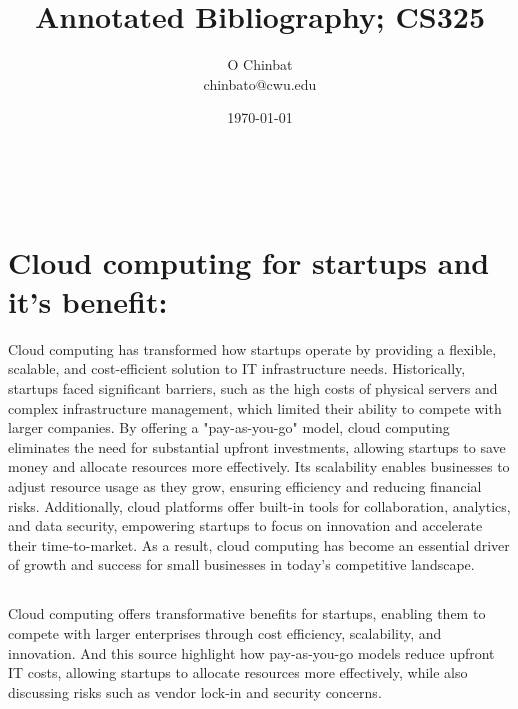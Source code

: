 \documentclass[12pt,letterpaper]{article}
\title{Annotated Bibliography; CS325}
\author{O Chinbat \\ chinbato@cwu.edu}
\date{\today}
\makeatletter
\renewcommand{\maketitle}{\bgroup
   \begin{center}
   \textbf{{\fontsize{18pt}{20}\selectfont \@title}}\\
   \vspace{10pt}
   {\fontsize{12pt}{0}\selectfont \@author} 
   \end{center}
}
\makeatother
\begin{document}
\maketitle
\thispagestyle{fancy}

\section*{Cloud computing for startups and it’s benefit: }
Cloud computing has transformed how startups operate by providing a flexible, scalable, and cost-efficient solution to IT infrastructure needs. Historically, startups faced significant barriers, such as the high costs of physical servers and complex infrastructure management, which limited their ability to compete with larger companies. By offering a "pay-as-you-go" model, cloud computing eliminates the need for substantial upfront investments, allowing startups to save money and allocate resources more effectively. Its scalability enables businesses to adjust resource usage as they grow, ensuring efficiency and reducing financial risks. Additionally, cloud platforms offer built-in tools for collaboration, analytics, and data security, empowering startups to focus on innovation and accelerate their time-to-market. As a result, cloud computing has become an essential driver of growth and success for small businesses in today’s competitive landscape.

\subsection*{}
Cloud computing offers transformative benefits for startups, enabling them to compete with larger enterprises through cost efficiency, scalability, and innovation. And this source highlight how pay-as-you-go models reduce upfront IT costs, allowing startups to allocate resources more effectively, while also discussing risks such as vendor lock-in and security concerns.
\end{document}
